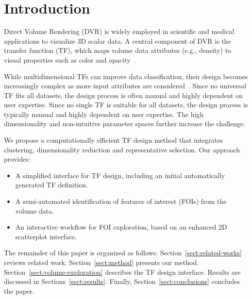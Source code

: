 \section{Introduction}
\label{sect:introduction}

Direct Volume Rendering (DVR) is widely employed in scientific and medical applications to visualize 3D scalar data. A central component of DVR is the transfer function (TF), which maps volume data attributes (e.g., density) to visual properties such as color and opacity~\cite{ljung2016}.

While multidimensional TFs can improve data classification, their design becomes increasingly complex as more input attributes are considered~\cite{ljung2016, pan2024}. Since no universal TF fits all datasets, the design process is often manual and highly dependent on user expertise. Since no single TF is suitable for all datasets, the design process is typically manual and highly dependent on user expertise. The high dimensionality and non-intuitive parameter spaces further increase the challenge.

We propose a computationally efficient TF design method that integrates clustering, dimensionality reduction and representative selection. Our approach provides:

\begin{itemize}
    \item A simplified interface for TF design, including an initial automatically generated TF definition.
    \item A semi-automated identification of features of interest (FOIs) from the volume data.
    \item An interactive workflow for FOI exploration, based on an enhanced 2D scatterplot interface.
\end{itemize}

The remainder of this paper is organized as follows: Section~\ref{sect:related-works} reviews related work. Section~\ref{sect:method} presents our method. Section~\ref{sect:volume-exploration} describes the TF design interface. Results are discussed in Sections~\ref{sect:results}. Finally, Section~\ref{sect:conclusions} concludes the paper.

